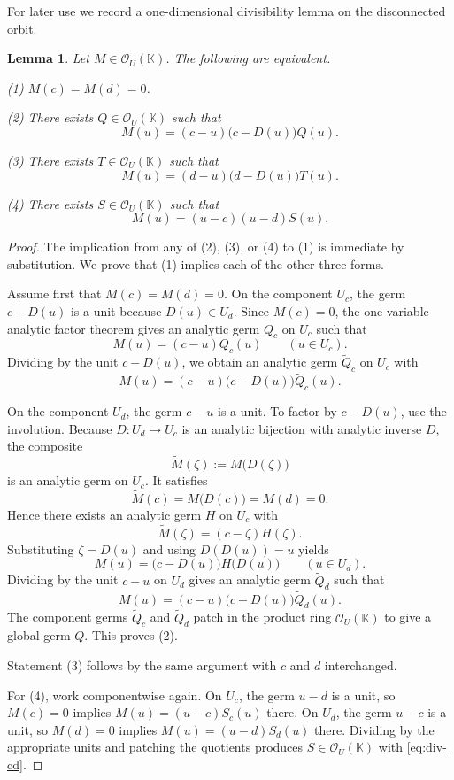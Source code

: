 \documentclass[11pt]{amsart}
\numberwithin{equation}{section}
\newtheorem{lemma}[theorem]{Lemma}
\theoremstyle{remark}
\theoremstyle{definition}
\newcommand{\K}{\mathbb{K}}
\newcommand{\Oc}{\mathcal{O}}
\begin{document}
For later use we record a one-dimensional divisibility lemma on the disconnected orbit.

\begin{lemma}\label{lem:orbit-divisibility}
Let $M\in \Oc_U(\K)$. The following are equivalent.

\smallskip
\noindent (1) $M(c)=M(d)=0$.

\smallskip
\noindent (2) There exists $Q\in \Oc_U(\K)$ such that
\begin{equation}\label{eq:div-cD}
M(u)=(c-u)\bigl(c-D(u)\bigr)Q(u).
\end{equation}

\smallskip
\noindent (3) There exists $T\in \Oc_U(\K)$ such that
\begin{equation}\label{eq:div-dD}
M(u)=(d-u)\bigl(d-D(u)\bigr)T(u).
\end{equation}

\smallskip
\noindent (4) There exists $S\in \Oc_U(\K)$ such that
\begin{equation}\label{eq:div-cd}
M(u)=(u-c)(u-d)S(u).
\end{equation}
\end{lemma}

\begin{proof}
The implication from any of (2), (3), or (4) to (1) is immediate by substitution. We prove that (1) implies each of the other three forms.

Assume first that $M(c)=M(d)=0$. On the component $U_c$, the germ $c-D(u)$ is a unit because $D(u)\in U_d$. Since $M(c)=0$, the one-variable analytic factor theorem gives an analytic germ $Q_c$ on $U_c$ such that
\[
M(u)=(c-u)Q_c(u)\qquad (u\in U_c).
\]
Dividing by the unit $c-D(u)$, we obtain an analytic germ $\widetilde Q_c$ on $U_c$ with
\[
M(u)=(c-u)\bigl(c-D(u)\bigr)\widetilde Q_c(u).
\]

On the component $U_d$, the germ $c-u$ is a unit. To factor by $c-D(u)$, use the involution. Because $D\colon U_d\to U_c$ is an analytic bijection with analytic inverse $D$, the composite
\[
\widetilde M(\zeta):=M\bigl(D(\zeta)\bigr)
\]
is an analytic germ on $U_c$. It satisfies
\[
\widetilde M(c)=M\bigl(D(c)\bigr)=M(d)=0.
\]
Hence there exists an analytic germ $H$ on $U_c$ with
\[
\widetilde M(\zeta)=(c-\zeta)H(\zeta).
\]
Substituting $\zeta=D(u)$ and using $D(D(u))=u$ yields
\[
M(u)=\bigl(c-D(u)\bigr)H\bigl(D(u)\bigr)\qquad (u\in U_d).
\]
Dividing by the unit $c-u$ on $U_d$ gives an analytic germ $\widetilde Q_d$ such that
\[
M(u)=(c-u)\bigl(c-D(u)\bigr)\widetilde Q_d(u).
\]
The component germs $\widetilde Q_c$ and $\widetilde Q_d$ patch in the product ring $\Oc_U(\K)$ to give a global germ $Q$. This proves (2).

Statement (3) follows by the same argument with $c$ and $d$ interchanged.

For (4), work componentwise again. On $U_c$, the germ $u-d$ is a unit, so $M(c)=0$ implies $M(u)=(u-c)S_c(u)$ there. On $U_d$, the germ $u-c$ is a unit, so $M(d)=0$ implies $M(u)=(u-d)S_d(u)$ there. Dividing by the appropriate units and patching the quotients produces $S\in \Oc_U(\K)$ with \eqref{eq:div-cd}.
\end{proof}
\end{document}
